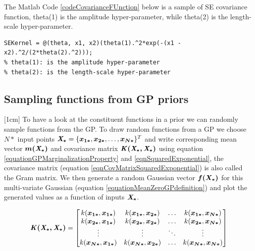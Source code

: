 The Matlab Code \ref{codeCovarianceFUnction} below is a sample of SE covariance function, theta(1) is the amplitude hyper-parameter, while theta(2) is the length-scale hyper-parameter.
\begin{mdframed}[hidealllines=true,backgroundcolor=lightgray!20]
\begin{lstlisting}[caption={A SE covariance function}, 
                    captionpos=b, 
                    label={codeCovarianceFUnction},
                    style=Matlab-editor, 
                    basicstyle=\color{black}\ttfamily\small,
                    backgroundcolor = \color{MatlabCellColour}]
% Standard exponential covariance function
SEKernel = @(theta, x1, x2)(theta(1).^2*exp(-(x1 - x2).^2/(2*theta(2).^2))); 
% theta(1): is the amplitude hyper-parameter
% theta(2): is the length-scale hyper-parameter
\end{lstlisting}
\end{mdframed}

\subsection{Sampling functions from GP priors}\label{subSecSamplingFunctionsGPPrior}
[1cm]
To have a look at the constituent functions in a prior we can randomly sample functions from the GP. To draw random functions from a GP we choose $N*$ input points $\bm{\mathit{X_{*}}} = \{\boldsymbol{x_{1*}}, \boldsymbol{x_{2*}}, \ldots , \boldsymbol{x_{N*}}\}^T$ and write corresponding mean vector $\boldsymbol{m(\bm{\mathit{X_{*}}})}$ and covariance matrix $\bm{\mathit{K(X_{*}, X_{*} )}}$ using equation \ref{equationGPMarginalizationProperty} and \ref{eqnSquaredExponential}, the covariance matrix (equation \ref{eqnCovMatrixSquaredExponential}) is also called the Gram matrix. We then generate a random Gaussian vector $\boldsymbol{f(X_{*})}$ for this multi-variate Gaussian (equation \ref{equationMeanZeroGPdefinition}) and plot the generated values as a function of inputs $\bm{\mathit{X_{*}}}$. 

\begin{equation}\label{eqnCovMatrixSquaredExponential}
\bm{\mathit{K(X_{*}, X_{*} )}} = \left [ \begin{matrix}
k(\boldsymbol{x_{1*}}, \boldsymbol{x_{1*}}) & k(\boldsymbol{x_{1*}}, \boldsymbol{x_{2*}}) & \ldots & k(\boldsymbol{x_{1*}}, \boldsymbol{x_{N*}})
\\ k(\boldsymbol{x_{2*}}, \boldsymbol{x_{1*}}) & k(\boldsymbol{x_{2*}}, \boldsymbol{x_{2*}}) & \ldots & k(\boldsymbol{x_{2*}}, \boldsymbol{x_{N*}})
\\ \vdots & \vdots & \ddots & \vdots
\\ k(\boldsymbol{x_{N*}}, \boldsymbol{x_{1*}}) & k(\boldsymbol{x_{N*}}, \boldsymbol{x_{2*}}) & \ldots & k(\boldsymbol{x_{N*}}, \boldsymbol{x_{N*}})
\end{matrix} \right ] 
\end{equation}

